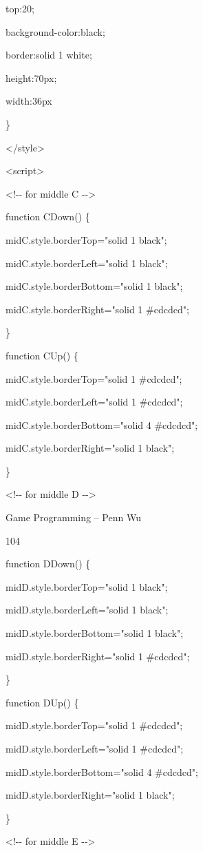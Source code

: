 \documentclass[
]{article}
\begin{document}
top:20;

background-color:black;

border:solid 1 white;

height:70px;

width:36px

\}

\textless/style\textgreater{}

\textless script\textgreater{}

\textless!-\/- for middle C -\/-\textgreater{}

function CDown() \{

midC.style.borderTop="solid 1 black";

midC.style.borderLeft="solid 1 black";

midC.style.borderBottom="solid 1 black";

midC.style.borderRight="solid 1 \#cdcdcd";

\}

function CUp() \{

midC.style.borderTop="solid 1 \#cdcdcd";

midC.style.borderLeft="solid 1 \#cdcdcd";

midC.style.borderBottom="solid 4 \#cdcdcd";

midC.style.borderRight="solid 1 black";

\}

\textless!-\/- for middle D -\/-\textgreater{}

Game Programming -- Penn Wu

104

\protect\hypertarget{index_split_007.htmlux5cux23p105}{}{}function
DDown() \{

midD.style.borderTop="solid 1 black";

midD.style.borderLeft="solid 1 black";

midD.style.borderBottom="solid 1 black";

midD.style.borderRight="solid 1 \#cdcdcd";

\}

function DUp() \{

midD.style.borderTop="solid 1 \#cdcdcd";

midD.style.borderLeft="solid 1 \#cdcdcd";

midD.style.borderBottom="solid 4 \#cdcdcd";

midD.style.borderRight="solid 1 black";

\}

\textless!-\/- for middle E -\/-\textgreater{}
\end{document}
